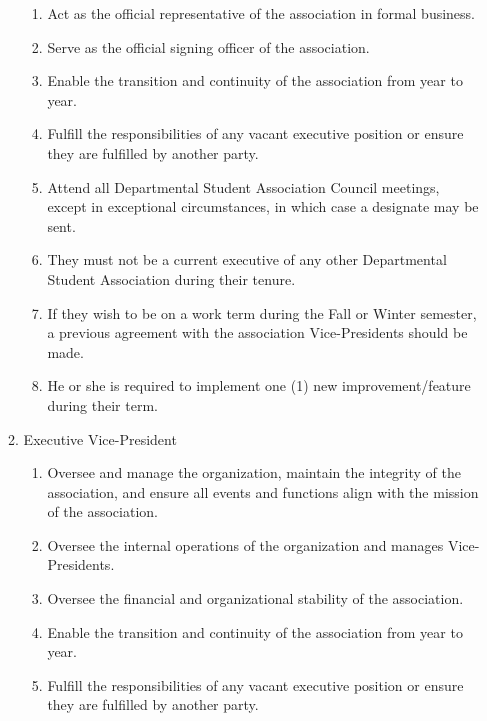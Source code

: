 \documentclass[12pt,a4paper]{article}
\begin{document}
\begin{enumerate}
\begin{enumerate}
\begin{enumerate}
\item Act as the official representative of the association in formal business.

\item Serve as the official signing officer of the association.

\item Enable the transition and continuity of the association from year to year.

\item Fulfill the responsibilities of any vacant executive position or ensure they are fulfilled by another party.

\item Attend all Departmental Student Association Council meetings, except in exceptional circumstances, in which case a designate may be sent.

\item They must not be a current executive of any other Departmental Student Association during their tenure.

\item If they wish to be on a work term during the Fall or Winter semester, a previous agreement with the association Vice-Presidents should be made.

\item He or she is required to implement one (1) new improvement/feature during their term.
\end{enumerate}

\item Executive Vice-President

\begin{enumerate}
\item Oversee and manage the organization, maintain the integrity of the association, and ensure all events and functions align with the mission of the association.

\item Oversee the internal operations of the organization and manages Vice-Presidents.

\item Oversee the financial and organizational stability of the association.

\item Enable the transition and continuity of the association from year to year.

\item Fulfill the responsibilities of any vacant executive position or ensure they are fulfilled by another party.


\end{enumerate}
\end{enumerate}
\end{enumerate}
\end{document}
